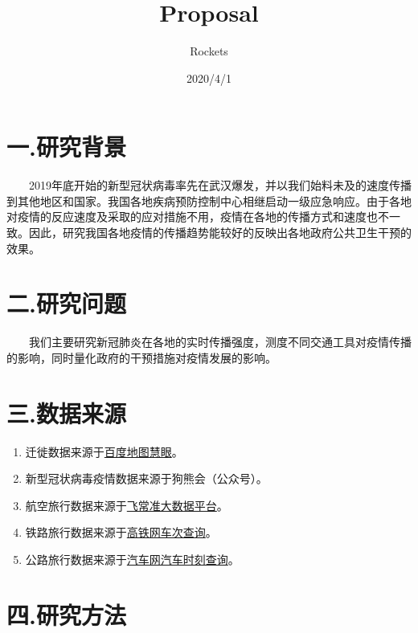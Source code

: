 \documentclass[
  12,
]{article}
\title{Proposal}
\author{Rockets}
\date{2020/4/1}
\providecommand{\tightlist}{%
  \setlength{\itemsep}{0pt}\setlength{\parskip}{0pt}}
\begin{document}
\maketitle

\hypertarget{ux4e00.ux7814ux7a76ux80ccux666f}{%
\section{一.研究背景}\label{ux4e00.ux7814ux7a76ux80ccux666f}}

  2019年底开始的新型冠状病毒率先在武汉爆发，并以我们始料未及的速度传播到其他地区和国家。我国各地疾病预防控制中心相继启动一级应急响应。由于各地对疫情的反应速度及采取的应对措施不用，疫情在各地的传播方式和速度也不一致。因此，研究我国各地疫情的传播趋势能较好的反映出各地政府公共卫生干预的效果。

\hypertarget{ux4e8c.ux7814ux7a76ux95eeux9898}{%
\section{二.研究问题}\label{ux4e8c.ux7814ux7a76ux95eeux9898}}

  我们主要研究新冠肺炎在各地的实时传播强度，测度不同交通工具对疫情传播的影响，同时量化政府的干预措施对疫情发展的影响。

\hypertarget{ux4e09.ux6570ux636eux6765ux6e90}{%
\section{三.数据来源}\label{ux4e09.ux6570ux636eux6765ux6e90}}

\begin{enumerate}
\def\labelenumi{\arabic{enumi}.}
\tightlist
\item
  迁徙数据来源于\href{http://qianxi.baidu.com/}{百度地图慧眼}。\\
\item
  新型冠状病毒疫情数据来源于狗熊会（公众号）。\\
\item
  航空旅行数据来源于\href{https://data.variflight.com/}{飞常准大数据平台}。\\
\item
  铁路旅行数据来源于\href{http://shike.gaotie.cn/}{高铁网车次查询}。\\
\item
  公路旅行数据来源于\href{https://www.qichezhan.cn/}{汽车网汽车时刻查询}。
\end{enumerate}

\hypertarget{ux56db.ux7814ux7a76ux65b9ux6cd5}{%
\section{四.研究方法}\label{ux56db.ux7814ux7a76ux65b9ux6cd5}}
\end{document}
